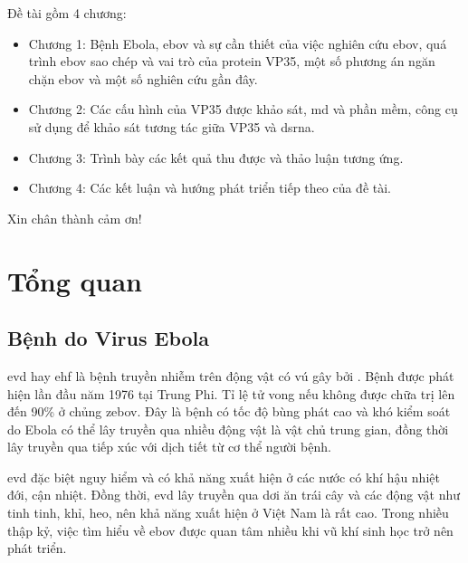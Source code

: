 \documentclass[12pt,a4paper,reqno, oneside]{book}
\begin{document}
	Đề tài gồm 4 chương:
	\begin{itemize}
	\item Chương 1: Bệnh Ebola, \gls{ebov} và sự cần thiết của việc nghiên cứu \gls{ebov}, quá trình \gls{ebov} sao chép và vai trò của protein VP35, một số phương án ngăn chặn \gls{ebov} và một số nghiên cứu gần đây.
	\item Chương 2: Các cấu hình của VP35 được khảo sát, \gls{md} và phần mềm, công cụ sử dụng để khảo sát tương tác giữa VP35 và \gls{dsrna}.
	\item Chương 3: Trình bày các kết quả thu được và thảo luận tương ứng.
	\item Chương 4: Các kết luận và hướng phát triển tiếp theo của đề tài.
	\end{itemize}

	\textrm{Xin chân thành cảm ơn!}
 
 
 
 
\newpage
\pagestyle{fancy}
\setcounter{page}{1}
\setcounter{chapter}{0}
\chapter{Tổng quan}

\section{Bệnh do Virus Ebola}

	\gls{evd} hay \gls{ehf} là bệnh truyền nhiễm trên động vật có vú gây bởi . Bệnh được phát hiện lần đầu năm 1976 tại Trung Phi\cite{Feldmann2003}. Tỉ lệ tử vong nếu không được chữa trị lên đến 90\% ở chủng \gls{zebov}. Đây là bệnh có tốc độ bùng phát cao và khó kiểm soát do Ebola có thể lây truyền qua nhiều động vật là vật chủ trung gian, đồng thời lây truyền qua tiếp xúc với dịch tiết từ cơ thể người bệnh\cite{Colebunders2000}.
	
	\gls{evd} đặc biệt nguy hiểm và có khả năng xuất hiện ở các nước có khí hậu nhiệt đới, cận nhiệt\cite{Ansari2014}. Đồng thời, \gls{evd} lây truyền qua dơi ăn trái cây và các động vật như tinh tinh, khỉ, heo\cite{Kuhn2010}, nên khả năng xuất hiện ở Việt Nam là rất cao. Trong nhiều thập kỷ, việc tìm hiểu về \gls{ebov} được quan tâm nhiều khi vũ khí sinh học trở nên phát triển\cite{Feldmann2003, Lee2009}.
	
\end{document}
